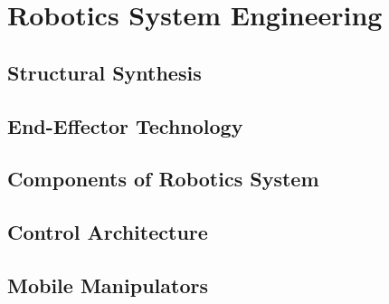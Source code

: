\chapter{Robotics System Engineering}

\section{Structural Synthesis}

\section{End-Effector Technology}

\section{Components of Robotics System}

\section{Control Architecture}

\section{Mobile Manipulators}
